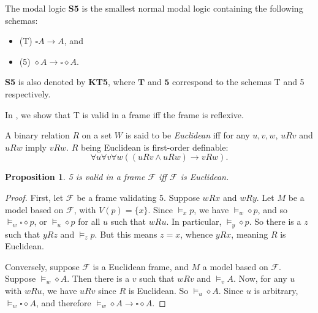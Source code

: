 \documentclass[12pt]{article}
\newtheorem{prop}{Proposition}
\begin{document}
The modal logic \textbf{S5} is the smallest normal modal logic containing the following schemas:
\begin{itemize}
\item (T) $\square A \to A$, and
\item (5) $\diamond A \to \square \diamond A$.
\end{itemize}
\textbf{S5} is also denoted by \textbf{KT5}, where $\textbf{T}$ and $\textbf{5}$ correspond to the schemas T and 5 respectively.

In , we show that T is valid in a frame iff the frame is reflexive.

A binary relation $R$ on a set $W$ is said to be \emph{Euclidean} iff for any $u,v,w$, $u R v$ and $u R w$ imply $v R w$.  $R$ being Euclidean is first-order definable: $$\forall u \forall v \forall w ((u R v \land u R w) \to v R w).$$

\begin{prop} 5 is valid in a frame $\mathcal{F}$ iff $\mathcal{F}$ is Euclidean. \end{prop}
\begin{proof}  First, let $\mathcal{F}$ be a frame validating 5.  Suppose $w R x$ and $w R y$.  Let $M$ be a model based on $\mathcal{F}$, with $V(p)=\lbrace x \rbrace$.  Since $\models_x p$, we have $\models_w \diamond p$, and so $\models_w \square \diamond p$, or $\models_u \diamond p$ for all $u$ such that $w R u$.  In particular, $\models_y \diamond p$.  So there is a $z$ such that $y R z$ and $\models_z p$.  But this means $z=x$, whence $y R x$, meaning $R$ is Euclidean.

Conversely, suppose $\mathcal{F}$ is a Euclidean frame, and $M$ a model based on $\mathcal{F}$.  Suppose $\models_w \diamond A$.  Then there is a $v$ such that $w R v$ and $\models_v A$.  Now, for any $u$ with $w R u$, we have $u R v$ since $R$ is Euclidean.  So $\models_u \diamond A$.  Since $u$ is arbitrary, $\models_w \square \diamond A$, and therefore $\models_w \diamond A \to \square \diamond A$.
\end{proof}
\end{document}
